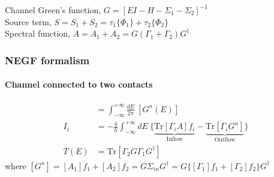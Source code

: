\documentclass{beamer}
\begin{document}
{\begin{frame}
\vspace{6pt}

Channel Green's function, $G = [EI-H-\Sigma_{1}-\Sigma_{2}]^{-1}$ \\ \vspace{6pt}
Source term, $S = S_{1} + S_{2} = \tau_{1}\{\Phi_{1}\} + \tau_{2}\{\Phi_{2}\}$ \\ \vspace{6pt}
Spectral function, $A = A_{1}+A_{2} = G(\Gamma_{1}+\Gamma_{2})G^{\dagger}$

    \end{frame}
}


{

    \begin{frame}
        \frametitle{NEGF formalism}
        \framesubtitle{Channel connected to two contacts}
        \scriptsize

\begin{align*}
    [\rho] &= \int_{-\infty}^{+\infty} \frac{dE}{2\pi}\ [G^{n}(E)] \\
    I_{i} &= -\frac{q}{h} \int_{-\infty}^{+\infty}dE\ \{\underbrace{\text{Tr}[\Gamma_{i}A]f_{i}}_\text{Inflow}-\underbrace{\text{Tr}[\Gamma_{i}G^{n}]}_\text{Outflow}\} \\
    \overline{T}(E) &= \text{Tr}[\Gamma_{2}G\Gamma_{1}G^{\dagger}]
\end{align*} 
where $[G^{n}] = [A_{1}]f_{1} + [A_{2}]f_{2} = G\Sigma_{in}G^{\dagger} = G\{[\Gamma_{1}]f_{1}+[\Gamma_{2}]f_{2}\}G^{\dagger}$

    \end{frame}
}
\end{document}
